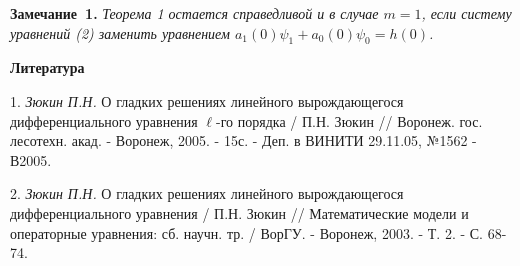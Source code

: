 \textbf{Замечание~1.} {\it Теорема 1 остается справедливой и в случае $m=1$, если систему уравнений (2) заменить уравнением $a_1(0)\psi_1+a_0(0)\psi_0=h(0)$.}



\smallskip \centerline{\bf Литература}\nopagebreak

1. {\it Зюкин П.Н.} О гладких решениях линейного вырождающегося дифференциального уравнения $\ell$-го порядка / П.Н. Зюкин // Воронеж. гос. лесотехн. акад. - Воронеж, 2005. - 15с. - Деп. в ВИНИТИ 29.11.05, №1562 - В2005.

2. {\it Зюкин П.Н.} О гладких решениях линейного вырождающегося дифференциального уравнения / П.Н. Зюкин // Математические модели и операторные уравнения: сб. научн. тр. / ВорГУ. - Воронеж, 2003. - Т. 2. - С. 68-74.

